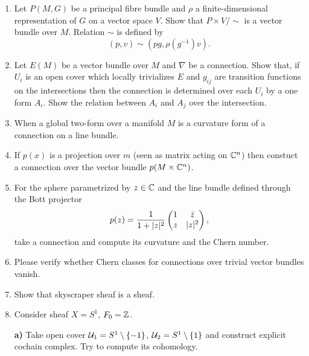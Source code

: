 \documentclass[a4paper,11pt]{article}
\begin{document}
\begin{enumerate}
\item Let $P( M, G )$ be a principal fibre bundle and $\rho$ a
  finite-dimensional representation of $G$ on a vector space $V$. Show
  that $P \times V / \sim$ is a vector bundle over $M$. Relation
  $\sim$ is defined by
  \begin{equation}
    \label{DiffGeo:09}
    ( p, v ) \sim \left( pg, \rho\left( g^{ -1 } \right) v \right).
  \end{equation}

\item Let $E( M )$ be a vector bundle over $M$ and $\nabla$ be a
  connection. Show that, if $U_{ i }$ is an open cover which locally
  trivializes $E$ and $g_{ i j }$ are transition functions on the
  intersections then the connection is determined over each $U_{ i }$
  by a one form $A_{ i }$. Show the relation between $A_{ i }$ and
  $A_{ j }$ over the intersection.

\item When a global two-form over a manifold $M$ is a curvature form
  of a connection on a line bundle.

\item If $p( x )$ is a projection over $m$ (seen as matrix acting on
  $\mathbb{C}^{ n }$) then constuct a connection over the vector bundle
  $p( M \times \mathbb{C}^{ n } )$.

\item For the sphere parametrized by $z \in \mathbb{C}$ and the line bundle
  defined through the Bott projector
  \begin{equation}
    \label{DiffGeo:10}
    p( z ) =
    \frac{ 1 }{ 1 + \lvert{  z  }\rvert^{ 2 } }
    \begin{pmatrix}
      1 & \bar{z} \\
      z & \lvert{  z  }\rvert^{ 2 }
    \end{pmatrix},
  \end{equation}
  take a connection and compute its curvature and the Chern number.

\item Please verify whether Chern classes for connections over trivial
  vector bundles vanish.

\item Show that skyscraper sheaf is a sheaf.

\item Consider sheaf $X = S^{ 1 }$, $F_{ 0 } = \mathbb{Z}$.

  \textbf{a)} Take open cover
  $\mathcal{U}_{ 1 } = S^{ 1 } \setminus \{ -1 \}$,
  $\mathcal{U}_{ 2 } = S^{ 1 } \setminus \{ 1 \}$ and construct explicit
  cochain complex. Try to compute its cohomology.


\end{enumerate}
\end{document}

